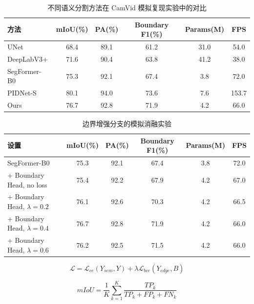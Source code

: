 
\begin{table}[!htbp]
\centering
\caption{不同语义分割方法在 CamVid 模拟复现实验中的对比}
\label{tab:main_compare}
\begin{tabular}{lccccc}
\toprule
方法 & mIoU(\%) & PA(\%) & Boundary F1(\%) & Params(M) & FPS \\
\midrule
UNet & 68.4 & 89.1 & 61.2 & 31.0 & 54.0 \\
DeepLabV3+ & 71.6 & 90.4 & 63.8 & 41.2 & 38.0 \\
SegFormer-B0 & 75.3 & 92.1 & 67.4 & 3.8 & 72.0 \\
PIDNet-S & 80.1 & 94.0 & 73.6 & 7.6 & 153.7 \\
Ours & 76.7 & 92.8 & 71.9 & 4.2 & 66.0 \\
\bottomrule
\end{tabular}
\end{table}

\begin{table}[!htbp]
\centering
\caption{边界增强分支的模拟消融实验}
\label{tab:ablation}
\begin{tabular}{lccccc}
\toprule
设置 & mIoU(\%) & PA(\%) & Boundary F1(\%) & Params(M) & FPS \\
\midrule
SegFormer-B0 & 75.3 & 92.1 & 67.4 & 3.8 & 72.0 \\
+ Boundary Head, no loss & 75.4 & 92.2 & 67.9 & 4.2 & 67.0 \\
+ Boundary Head, $\lambda=0.2$ & 76.1 & 92.6 & 70.3 & 4.2 & 66.5 \\
+ Boundary Head, $\lambda=0.4$ & 76.7 & 92.8 & 71.9 & 4.2 & 66.0 \\
+ Boundary Head, $\lambda=0.6$ & 76.2 & 92.5 & 71.5 & 4.2 & 66.0 \\
\bottomrule
\end{tabular}
\end{table}

\begin{equation}
\mathcal{L} = \mathcal{L}_{ce}(Y_{sem}, Y) + \lambda \mathcal{L}_{bce}(Y_{edge}, B)
\end{equation}

\begin{equation}
mIoU = \frac{1}{K}\sum_{k=1}^{K}\frac{TP_k}{TP_k + FP_k + FN_k}
\end{equation}


